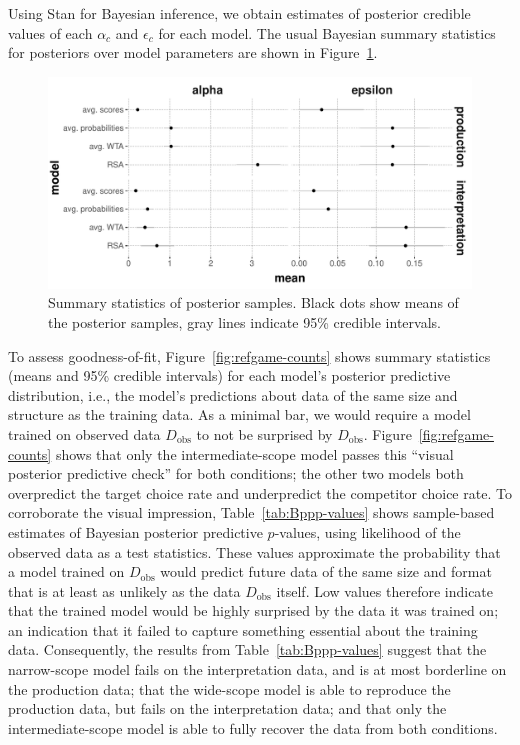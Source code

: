 \documentclass{article}
\begin{document}
Using Stan \citep{Team2023:The-Stan-Core-L} for Bayesian inference, we obtain estimates of posterior credible values of each $\alpha_{c}$ and $\epsilon_{c}$ for each model.
The usual Bayesian summary statistics for posteriors over model parameters are shown in Figure~\ref{fig:posterior-stats}.

\begin{figure}
  \centering

  \includegraphics[width=0.9\linewidth]{00-pics/posterior-stats.pdf}

  \caption{
    Summary statistics of posterior samples.
    Black dots show means of the posterior samples, gray lines indicate 95\% credible intervals.
  }
  \label{fig:posterior-stats}
\end{figure}

To assess goodness-of-fit, Figure~\ref{fig:refgame-counts} shows summary statistics (means and 95\% credible intervals) for each model's posterior predictive distribution, i.e., the model's predictions about data of the same size and structure as the training data.
As a minimal bar, we would require a model trained on observed data $D_{\text{obs}}$ to not be surprised by $D_{\text{obs}}$.
Figure~\ref{fig:refgame-counts} shows that only the intermediate-scope model passes this ``visual posterior predictive check'' for both conditions; the other two models both overpredict the target choice rate and underpredict the competitor choice rate.
To corroborate the visual impression, Table~\ref{tab:Bppp-values} shows sample-based estimates of Bayesian posterior predictive $p$-values, using likelihood of the observed data as a test statistics.
These values approximate the probability that a model trained on $D_{\text{obs}}$ would predict future data of the same size and format that is at least as unlikely as the data $D_{\text{obs}}$ itself.
Low values therefore indicate that the trained model would be highly surprised by the data it was trained on; an indication that it failed to capture something essential about the training data.
Consequently, the results from Table~\ref{tab:Bppp-values} suggest that the narrow-scope model fails on the interpretation data, and is at most borderline on the production data; that the wide-scope model is able to reproduce the production data, but fails on the interpretation data; and that only the intermediate-scope model is able to fully recover the data from both conditions.
\end{document}
